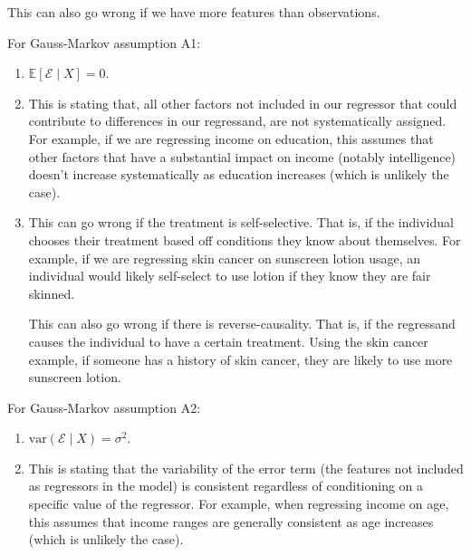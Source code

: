 \documentclass[12pt,twoside]{article}
\begin{document}
\begin{problems}
\begin{problemparts}
\begin{enumerate}[label=\textbf{\roman*})]
        This can also go wrong if we have more features than observations.
        
\end{enumerate}

\problempart %

For Gauss-Markov assumption A1:

\begin{enumerate}[label=\textbf{\roman*})]

    \item $\mathbb{E}\left[\mathcal{E} \mid X\right] = 0$.
    
    \item This is stating that, all other factors not included in our regressor 
        that could contribute to differences in our regressand, are not 
        systematically assigned. For example, if we are regressing income on 
        education, this assumes that other factors that have a substantial 
        impact on income (notably intelligence) doesn't increase systematically 
        as education increases (which is unlikely the case).
        
    \item This can go wrong if the treatment is self-selective. That is, if the
        individual chooses their treatment based off conditions they know about
        themselves. For example, if we are regressing skin cancer on sunscreen
        lotion usage, an individual would likely self-select to use lotion if 
        they know they are fair skinned.
        
        This can also go wrong if there is reverse-causality. That is, if the
        regressand causes the individual to have a certain treatment. Using the
        skin cancer example, if someone has a history of skin cancer, they are
        likely to use more sunscreen lotion.
\end{enumerate}

\problempart %

For Gauss-Markov assumption A2:

\begin{enumerate}[label=\textbf{\roman*})]

    \item $\mathrm{var}(\mathcal{E} \mid X) = \sigma^2 $.
    
    \item This is stating that the variability of the error term (the features
        not included as regressors in the model) is consistent regardless of 
        conditioning on a specific value of the regressor. For example, when
        regressing income on age, this assumes that income ranges are generally
        consistent as age increases (which is unlikely the case).
        

\end{enumerate}
\end{problemparts}
\end{problems}
\end{document}
